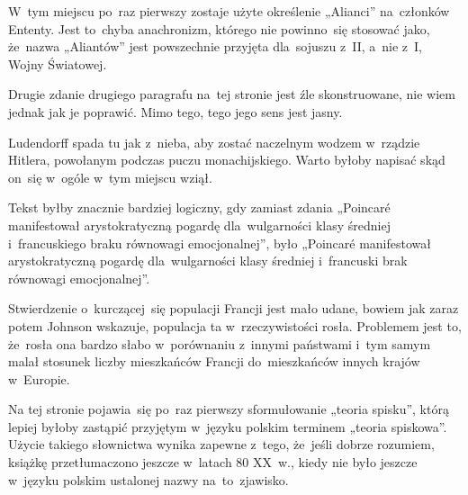 \documentclass[a4paper,11pt]{article}
\numberwithin{equation}{section}
\begin{document}
\VerSpaceFour





\noindent
{} W~tym miejscu po~raz pierwszy zostaje użyte określenie „Alianci”
na~członków Ententy. Jest to~chyba anachronizm, którego nie powinno~się
stosować jako, że~nazwa „Aliantów” jest powszechnie przyjęta dla~sojuszu
z~II, a~nie z~I, Wojny Światowej.

\VerSpaceFour





\noindent
{} Drugie zdanie drugiego paragrafu na~tej stronie jest źle
skonstruowane, nie wiem jednak jak je poprawić. Mimo tego, tego
jego sens jest jasny.

\VerSpaceFour





\noindent
{} Ludendorff spada tu jak z~nieba, aby zostać naczelnym wodzem
w~rządzie Hitlera, powołanym podczas puczu monachijskiego. Warto byłoby
napisać skąd on~się w~ogóle w~tym miejscu wziął.

\VerSpaceFour





\noindent
{} Tekst byłby znacznie bardziej logiczny, gdy zamiast zdania
„Poincar\'{e} manifestował arystokratyczną pogardę dla~wulgarności klasy
średniej i~francuskiego braku równowagi emocjonalnej”, było „Poincar\'{e}
manifestował arystokratyczną pogardę dla~wulgarności klasy średniej
i~francuski brak równowagi emocjonalnej”.

\VerSpaceFour





\noindent
{} Stwierdzenie o~kurczącej~się populacji Francji jest mało udane,
bowiem jak zaraz potem Johnson wskazuje, populacja ta w~rzeczywistości
rosła. Problemem jest to, że~rosła ona bardzo słabo w~porównaniu z~innymi
państwami i~tym samym malał stosunek liczby mieszkańców Francji
do~mieszkańców innych krajów w~Europie.

\VerSpaceFour





\noindent
{} Na tej stronie pojawia~się po~raz pierwszy sformułowanie „teoria
spisku”, którą lepiej byłoby zastąpić przyjętym w~języku polskim terminem
„teoria spiskowa”. Użycie takiego słownictwa wynika zapewne z~tego,
że~jeśli dobrze rozumiem, książkę przetłumaczono jeszcze w~latach 80 XX~w.,
kiedy nie było jeszcze w~języku polskim ustalonej nazwy na~to~zjawisko.
\end{document}
